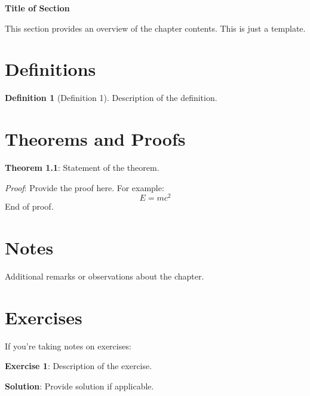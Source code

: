 \documentclass[12pt]{article}   %
\theoremstyle{definition}
\newtheorem{definition}{Definition}[section]
\theoremstyle{remark}
\begin{document}
\begin{center}
    \Large{\textbf{Title of Section}} \\
\end{center}

This section provides an overview of the chapter contents. This is just a template.

\section{Definitions}
\begin{definition}[Definition 1]
	Description of the definition.
\end{definition}

\section{Theorems and Proofs}
\textbf{Theorem 1.1}: Statement of the theorem.

\textit{Proof}: Provide the proof here. For example:
\[
E = mc^2
\]
End of proof.

\section{Notes}
Additional remarks or observations about the chapter.

\section{Exercises}
If you're taking notes on exercises:

\medskip

\textbf{Exercise 1}: Description of the exercise.

\textbf{Solution}: Provide solution if applicable.

\end{document}
